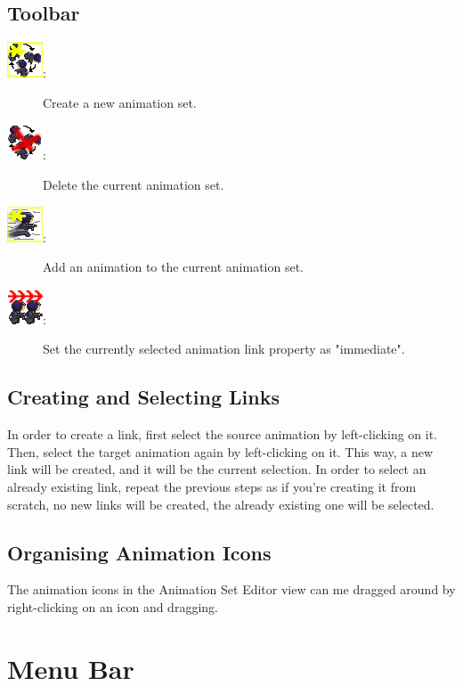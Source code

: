 \documentclass{article}
\begin{document}
\subsection{Toolbar}
\begin{description}
\item[\includegraphics{icons/NewAnimationSet}:] Create a new animation set.
\item[\includegraphics{icons/deleteAnimationSet}:] Delete the current animation set.
\item[\includegraphics{icons/NewAnimation}:] Add an animation to the current animation set.
\item[\includegraphics{icons/ImmediateLink}:] Set the currently selected animation link property as "immediate".
\end{description}

\subsection{Creating and Selecting Links}
In order to create a link, first select the source animation by left-clicking on it. Then, select the target animation again by left-clicking on it. This way, a new
link will be created, and it will be the current selection. In order to select an already existing link, repeat the previous steps as if you're creating it from scratch,
no new links will be created, the already existing one will be selected.

\subsection{Organising Animation Icons}
The animation icons in the Animation Set Editor view can me dragged around by right-clicking on an icon and dragging.

\section{Menu Bar}
\end{document}
